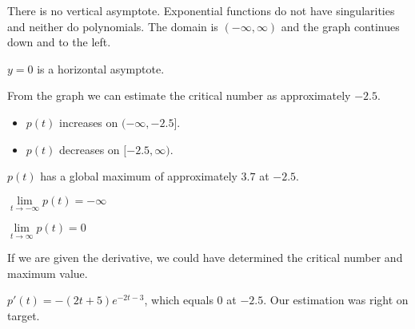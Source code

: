 \documentclass{ximera}
\begin{document}
\begin{example}
\begin{explanation}
\begin{image}
\end{image}




There is no vertical asymptote. Exponential functions do not have singularities and neither do polynomials.  The domain is $(-\infty, \infty)$ and the graph continues down and to the left.

$y = 0$ is a horizontal asymptote.

From the graph we can estimate the critical number as approximately $-2.5$.





\begin{itemize}
\item $p(t)$ increases on $(-\infty, -2.5]$.
\item $p(t)$ decreases on $[-2.5, \infty)$.
\end{itemize}


$p(t)$ has a global maximum of approximately $3.7$ at $-2.5$.


$\lim\limits_{t \to -\infty} p(t) = -\infty$


$\lim\limits_{t \to \infty} p(t) = 0$




\end{explanation}

\end{example}

If we are given the derivative, we could have determined the critical number and maximum value.


$p'(t) = -(2t+5) e^{-2t-3}$, which equals $0$ at $-2.5$.  Our estimation was right on target.  
\end{document}
